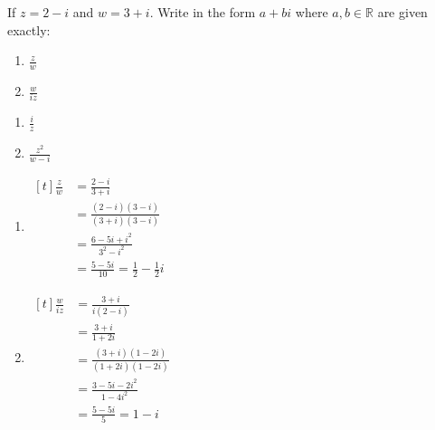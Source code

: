 \documentclass[11pt,a4paper]{book}
\newcommand{\R}{\mathbb{R}}
\begin{document}
\begin{example}

If $z=2-i$ and $w=3+i$. Write in the form $a+bi$ where $a,b\in\R$
are given exactly:

\begin{minipage}[t]{0.33\textwidth}

\begin{enumerate}[label=(\alph*)]

\item  ${\displaystyle \frac{z}{w}}$

\addtocounter{enumi}{1}

\item  ${\displaystyle \frac{w}{iz}}$

\end{enumerate}

\end{minipage}
\begin{minipage}[t]{0.33\textwidth}

\begin{enumerate}[label=(\alph*),start=2]

\item  ${\displaystyle \frac{i}{z}}$

\addtocounter{enumi}{1}

\item  ${\displaystyle \frac{z^{2}}{w-i}}$

\end{enumerate}

\end{minipage}

\medskip{}

\Solution

\begin{minipage}[t]{0.5\textwidth}

\begin{enumerate}[label=(\alph*)]

\item
$
\begin{aligned}[t]
\frac{z}{w} & =\frac{2-i}{3+i}\\
 & =\frac{\left(2-i\right)\left(3-i\right)}{\left(3+i\right)\left(3-i\right)}\\
 & =\frac{6-5i+i^{2}}{3^{2}-i^{2}}\\
 & =\frac{5-5i}{10}=\frac{1}{2}-\frac{1}{2}i
\end{aligned}
$

\addtocounter{enumi}{1}

\item
$
\begin{aligned}[t]
\frac{w}{iz} & =\frac{3+i}{i\left(2-i\right)}\\
 & =\frac{3+i}{1+2i}\\
 & =\frac{\left(3+i\right)\left(1-2i\right)}{\left(1+2i\right)\left(1-2i\right)}\\
 & =\frac{3-5i-2i^{2}}{1-4i^{2}}\\
 & =\frac{5-5i}{5}=1-i
\end{aligned}
$


\end{enumerate}
\end{minipage}
\end{example}
\end{document}
